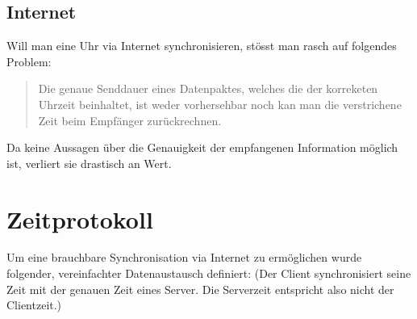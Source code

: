 \subsection{Internet} \label{Anaylse:Internet}

Will man eine Uhr via Internet synchronisieren, stösst man rasch auf folgendes Problem:

\begin{verse}
Die genaue Senddauer eines  Datenpaktes, welches die der korreketen Uhrzeit beinhaltet, ist weder vorhersehbar noch kan man die verstrichene Zeit beim Empfänger zurückrechnen.
\end{verse}

Da keine Aussagen über die Genauigkeit der empfangenen Information möglich ist, verliert sie drastisch an Wert.

\section{Zeitprotokoll}
Um eine brauchbare Synchronisation via Internet zu ermöglichen wurde folgender, vereinfachter Datenaustausch definiert: (Der Client synchronisiert seine Zeit mit der genauen Zeit eines Server. Die Serverzeit entspricht also nicht der Clientzeit.)\cite{ntp_stackoverfow}

